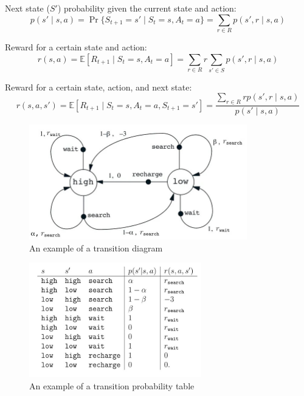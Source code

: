 Next state ($S'$) probability given the current state and action:
\[
    p(s' \mid s, a) = \Pr\{S_{t+1} = s' \mid S_t = s, A_t = a\} = \sum_{r \in {R}} p(s', r \mid s, a)
\]

Reward for a certain state and action:
\[
    r(s, a) = \mathbb{E}[R_{t+1} \mid S_t = s, A_t = a] = \sum_{r \in {R}} r \sum_{s' \in {S}} p(s', r \mid s, a)
\]

Reward for a certain state, action, and next state:
\[
    r(s, a, s') = \mathbb{E}[R_{t+1} \mid S_t = s, A_t = a, S_{t+1} = s'] = \frac{\displaystyle\sum_{r \in {R}} r p(s', r \mid s, a)}{p(s' \mid s, a)}
\]

\begin{table}[H]
    \centering
    \begin{minipage}{0.35\linewidth}
        \begin{figure}[H]
            \includegraphics[height=5cm]{Pictures/deep-reinforcement-learning/eg1_mdp_fig.jpg}
            \caption{An example of a transition diagram}
        \end{figure}
    \end{minipage}
    \hfill
    \begin{minipage}{0.35\linewidth}
        \begin{figure}[H]
            \includegraphics[height=5cm]{Pictures/deep-reinforcement-learning/eg1_mdp_table.jpg}
            \caption{An example of a transition probability table}
        \end{figure}
    \end{minipage}
\end{table}

